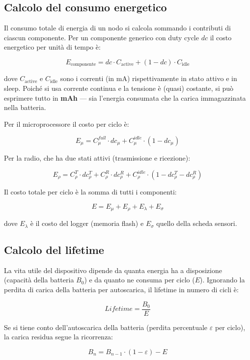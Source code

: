\documentclass[
  italian,
  openany]{book}
\begin{document}
\subsection{Calcolo del consumo
energetico}\label{calcolo-del-consumo-energetico}

Il consumo totale di energia di un nodo si calcola sommando i contributi
di ciascun componente. Per un componente generico con duty cycle \(dc\)
il costo energetico per unità di tempo è:

\[E_\text{componente} = dc \cdot C_\text{active} + (1 - dc) \cdot C_\text{idle}\]

dove \(C_\text{active}\) e \(C_\text{idle}\) sono i correnti (in mA)
rispettivamente in stato attivo e in sleep. Poiché si usa corrente
continua e la tensione è (quasi) costante, si può esprimere tutto in
\textbf{mAh} --- sia l'energia consumata che la carica immagazzinata
nella batteria.

Per il microprocessore il costo per ciclo è:

\[E_\mu = C_\mu^{full} \cdot dc_\mu + C_\mu^{idle} \cdot (1 - dc_\mu)\]

Per la radio, che ha due stati attivi (trasmissione e ricezione):

\[E_\rho = C_\rho^T \cdot dc_\rho^T + C_\rho^R \cdot dc_\rho^R + C_\rho^{idle} \cdot (1 - dc_\rho^T - dc_\rho^R)\]

Il costo totale per ciclo è la somma di tutti i componenti:

\[E = E_\mu + E_\rho + E_\lambda + E_\sigma\]

dove \(E_\lambda\) è il costo del logger (memoria flash) e \(E_\sigma\)
quello della scheda sensori.

\subsection{Calcolo del lifetime}\label{calcolo-del-lifetime}

La vita utile del dispositivo dipende da quanta energia ha a
disposizione (capacità della batteria \(B_0\)) e da quanto ne consuma
per ciclo (\(E\)). Ignorando la perdita di carica della batteria per
autoscarica, il lifetime in numero di cicli è:

\[Lifetime = \frac{B_0}{E}\]

Se si tiene conto dell'autoscarica della batteria (perdita percentuale
\(\varepsilon\) per ciclo), la carica residua segue la ricorrenza:

\[B_n = B_{n-1} \cdot (1 - \varepsilon) - E\]
\end{document}

